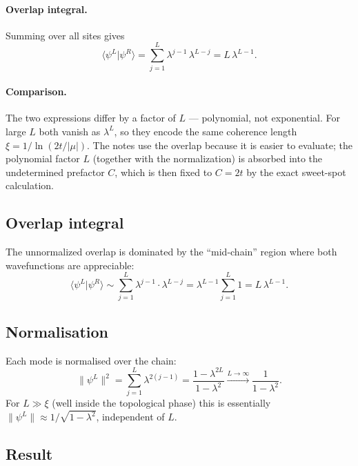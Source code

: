 \documentclass[11pt]{article}
\begin{document}
\paragraph{Overlap integral.}
Summing over all sites gives
\begin{equation}
  \langle \psi^L | \psi^R \rangle
  = \sum_{j=1}^{L} \lambda^{j-1}\,\lambda^{L-j}
  = L\,\lambda^{L-1}.
\end{equation}

\paragraph{Comparison.}
The two expressions differ by a factor of $L$ — polynomial, not exponential.
For large $L$ both vanish as $\lambda^L$, so they encode the same coherence
length $\xi = 1/\ln(2t/|\mu|)$.
The notes use the overlap because it is easier to evaluate; the polynomial
factor $L$ (together with the normalization) is absorbed into the
undetermined prefactor $C$, which is then fixed to $C=2t$ by the exact
sweet-spot calculation.

\subsection{Overlap integral}

The unnormalized overlap is dominated by the ``mid-chain'' region where both
wavefunctions are appreciable:
\begin{equation}
  \langle \psi^L | \psi^R \rangle
  \sim \sum_{j=1}^{L} \lambda^{j-1} \cdot \lambda^{L-j}
  = \lambda^{L-1} \sum_{j=1}^{L} 1
  = L\,\lambda^{L-1}.
\end{equation}

\subsection{Normalisation}

Each mode is normalised over the chain:
\begin{equation}
  \|\psi^L\|^2
  = \sum_{j=1}^{L} \lambda^{2(j-1)}
  = \frac{1 - \lambda^{2L}}{1 - \lambda^2}
  \xrightarrow{L\to\infty} \frac{1}{1-\lambda^2}.
\end{equation}
For $L \gg \xi$ (well inside the topological phase) this is essentially
$\|\psi^L\| \approx 1/\sqrt{1-\lambda^2}$, independent of $L$.

\subsection{Result}
\end{document}
